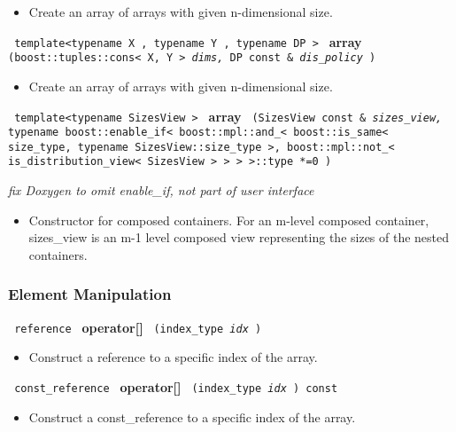 \begin{itemize}
\item
Create an array of arrays with given n-dimensional size. 
\end{itemize}
 
\noindent
\texttt{%
template<typename X , typename Y , typename DP >
}
\newline
\textbf{array}%
\texttt{%
(boost::tuples::cons< X, Y > 
\textit{dims,}%
DP const \&
\textit{dis\_policy}%
)
}

\begin{itemize}
\item
Create an array of arrays with given n-dimensional size. 
\end{itemize}
 
\noindent
\texttt{%
template<typename SizesView >
}
\newline
\textbf{array}%
\texttt{%
(SizesView const \&
\textit{sizes\_view,}%
typename boost::enable\_if< boost::mpl::and\_< boost::is\_same< size\_type, 
typename SizesView::size\_type >, 
boost::mpl::not\_< is\_distribution\_view< SizesView > > > >::type *=0
)
}

\vspace{0.4cm} \emph{fix Doxygen to omit enable\_if, not part of user interface}

\begin{itemize}
\item
Constructor for composed containers. For an m-level composed container, sizes\_view is an m-1 level composed view representing the sizes of the nested containers. 
\end{itemize}

\subsubsection{Element Manipulation}

\noindent
\texttt{%
reference
}
\textbf{operator[]}%
\texttt{%
(index\_type 
\textit{idx}%
)
}

\begin{itemize}
\item
Construct a reference to a specific index of the array.
\end{itemize}
 
\noindent%
\texttt{%
const\_reference
}
\textbf{operator[]}%
\texttt{%
(index\_type 
\textit{idx}%
) const
}

\begin{itemize}
\item
Construct a const\_reference to a specific index of the array.
\end{itemize}
 

